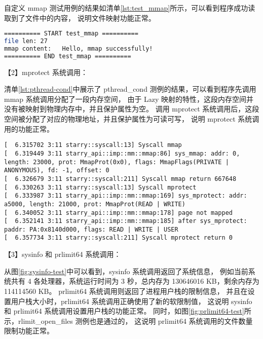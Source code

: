 自定义 mmap 测试用例的结果如清单\ref{lst:test_mmap}所示，可以看到程序成功读取到了文件中的内容，
说明文件映射功能正常。

\begin{lstlisting}[language=bash, caption=自定义 mmap 测例运行结果, label=lst:test_mmap]
========== START test_mmap ==========
file len: 27
mmap content:   Hello, mmap successfully!
========== END test_mmap ==========
\end{lstlisting}

【2】mprotect 系统调用：

清单\ref{lst:pthread-cond}中展示了 pthread\_cond 测例的结果，可以看到程序先调用 mmap 系统调用分配了一段内存空间，
由于 Lazy 映射的特性，这段内存空间并没有被映射到物理内存中，并且保护属性为空。
调用 mprotect 系统调用后，这段空间被分配了对应的物理地址，并且保护属性为可读可写，
说明 mprotect 系统调用的功能正常。

\begin{lstlisting}[caption=运行 pthread\_cond 测例的部分输出（info 级信息）, label=lst:pthread-cond]
[  6.315702 3:11 starry::syscall:13] Syscall mmap
[  6.319449 3:11 starry_api::imp::mm::mmap:86] sys_mmap: addr: 0, length: 23000, prot: MmapProt(0x0), flags: MmapFlags(PRIVATE | ANONYMOUS), fd: -1, offset: 0
[  6.326679 3:11 starry::syscall:211] Syscall mmap return 667648
[  6.330263 3:11 starry::syscall:13] Syscall mprotect
[  6.333987 3:11 starry_api::imp::mm::mmap:169] sys_mprotect: addr: a5000, length: 21000, prot: MmapProt(READ | WRITE)
[  6.340052 3:11 starry_api::imp::mm::mmap:178] page not mapped
[  6.352141 3:11 starry_api::imp::mm::mmap:185] after sys_mprotect: paddr: PA:0x8140d000, flags: READ | WRITE | USER
[  6.357734 3:11 starry::syscall:211] Syscall mprotect return 0 
\end{lstlisting}

【3】sysinfo 和 prlimit64 系统调用：


从图\ref{fig:sysinfo-test}中可以看到，sysinfo 系统调用返回了系统信息，
例如当前系统共有 4 各处理器，系统运行时间为 3 秒，总内存为 130646016 KB，剩余内存为 114114560 KB。
prlimit64 系统调用则返回了进程用户栈的限制信息，
并且在设置用户栈大小时，prlimit64 系统调用正确使用了新的软限制值，
这说明 sysinfo 和 prlimit64 系统调用设置用户栈的功能正常。
同时，如图\ref{fig:prlimit64-test}所示，rlimit\_open\_files 测例也是通过的，
这说明 prlimit64 系统调用的文件数量限制功能正常。

